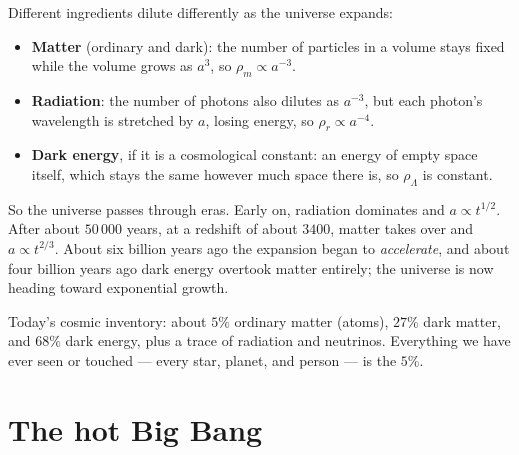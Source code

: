 Different ingredients dilute differently as the universe expands:
\begin{itemize}[itemsep=3pt]
  \item \textbf{Matter} (ordinary and dark): the number of particles in a volume stays fixed while the volume grows as $a^3$, so $\rho_m\propto a^{-3}$.
  \item \textbf{Radiation}: the number of photons also dilutes as $a^{-3}$, but each photon's wavelength is stretched by $a$, losing energy, so $\rho_r\propto a^{-4}$.
  \item \textbf{Dark energy}, if it is a cosmological constant: an energy of empty space itself, which stays the same however much space there is, so $\rho_\Lambda$ is constant.
\end{itemize}
So the universe passes through eras. Early on, radiation dominates and $a\propto t^{1/2}$. After about $50\,000$ years, at a redshift of about $3400$, matter takes over and $a\propto t^{2/3}$. About six billion years ago the expansion began to \emph{accelerate}, and about four billion years ago dark energy overtook matter entirely; the universe is now heading toward exponential growth.

\begin{keyidea}
Today's cosmic inventory: about $5\%$ ordinary matter (atoms), $27\%$ dark matter, and $68\%$ dark energy, plus a trace of radiation and neutrinos. Everything we have ever seen or touched --- every star, planet, and person --- is the $5\%$.
\end{keyidea}

\section{The hot Big Bang}

